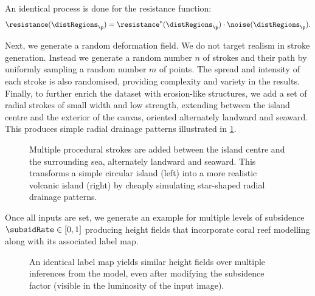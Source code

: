 An identical process is done for the resistance function:
\begin{align*}
    \resistance(\distRegions_\p) = \resistance^*(\distRegions_\p) \cdot \noise(\distRegions_\p).
\end{align*}

Next, we generate a random deformation field. We do not target realism in stroke generation. Instead we generate a random number $n$ of strokes and their path by uniformly sampling a random number $m$ of points. The spread and intensity of each stroke is also randomised, providing complexity and variety in the results.
Finally, to further enrich the dataset with erosion-like structures, we add a set of radial strokes of small width and low strength, extending between the island centre and the exterior of the canvas, oriented alternately landward and seaward. This produces simple radial drainage patterns illustrated in \cref{fig:coral-island-radial-pattern-example}.

\begin{figure}
    \caption[Radial drainage inserted in our dataset generation]{Multiple procedural strokes are added between the island centre and the surrounding sea, alternately landward and seaward. This transforms a simple circular island (left) into a more realistic volcanic island (right) by cheaply simulating star-shaped radial drainage patterns.}
    \label{fig:coral-island-radial-pattern-example}
\end{figure}

Once all inputs are set, we generate an example for multiple levels of subsidence $\subsidRate \in [0, 1]$ producing height fields that incorporate coral reef modelling along with its associated label map.

\begin{figure}
    \caption[Multiple islands generated with two subsidence values]{An identical label map yields similar height fields over multiple inferences from the model, even after modifying the subsidence factor (visible in the luminosity of the input image).}
    \label{fig:coral-island-results-subsidence}
\end{figure}

